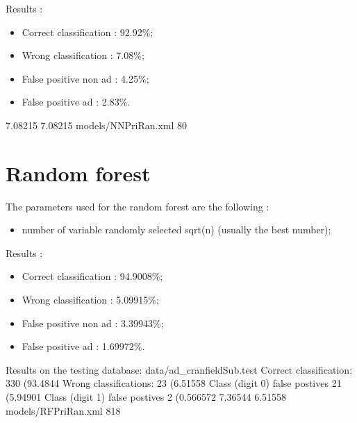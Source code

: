   Results :
  \begin{itemize}
    \item Correct classification : 92.92\%;
    \item Wrong classification : 7.08\%;
    \item False positive non ad : 4.25\%;
    \item False positive ad : 2.83\%.
  \end{itemize}
  7.08215
  7.08215
  models/NNPriRan.xml
  80

\section{Random forest}
The parameters used for the random forest are the following :
  \begin{itemize}
    \item number of variable randomly selected sqrt(n) (usually the best number);
  \end{itemize}
Results :
\begin{itemize}
  \item Correct classification : 94.9008\%;
  \item Wrong classification : 5.09915\%;
  \item False positive non ad : 3.39943\%;
  \item False positive ad : 1.69972\%.
\end{itemize}

Results on the testing database: data/ad_cranfieldSub.test
	Correct classification: 330 (93.4844%
	Wrong classifications: 23 (6.51558%
	Class (digit 0) false postives 	21 (5.94901%
	Class (digit 1) false postives 	2 (0.566572%
7.36544
6.51558
models/RFPriRan.xml
818
